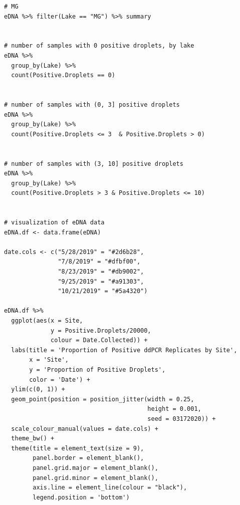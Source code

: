 \documentclass[12pt]{article}\usepackage[]{graphicx}\usepackage[]{color}
\makeatletter
\newenvironment{kframe}{%
 \def\at@end@of@kframe{}%
 \ifinner\ifhmode%
  \def\at@end@of@kframe{\end{minipage}}%
  \begin{minipage}{\columnwidth}%
 \fi\fi%
 \def\FrameCommand##1{\hskip\@totalleftmargin \hskip-\fboxsep
 \colorbox{shadecolor}{##1}\hskip-\fboxsep
     \hskip-\linewidth \hskip-\@totalleftmargin \hskip\columnwidth}%
 \MakeFramed {\advance\hsize-\width
   \@totalleftmargin\z@ \linewidth\hsize
   \@setminipage}}%
 {\par\unskip\endMakeFramed%
 \at@end@of@kframe}
\newenvironment{knitrout}{}{} %
\newenvironment{kframe}{%
 \def\at@end@of@kframe{}%
 \ifinner\ifhmode%
  \def\at@end@of@kframe{\end{minipage}}%
  \begin{minipage}{\columnwidth}%
 \fi\fi%
 \def\FrameCommand##1{\hskip\@totalleftmargin \hskip-\fboxsep
 \colorbox{shadecolor}{##1}\hskip-\fboxsep
     \hskip-\linewidth \hskip-\@totalleftmargin \hskip\columnwidth}%
 \MakeFramed {\advance\hsize-\width
   \@totalleftmargin\z@ \linewidth\hsize
   \@setminipage}}%
 {\par\unskip\endMakeFramed%
 \at@end@of@kframe}
\newenvironment{knitrout}{}{} %
\makeatother
\begin{document}
\begin{knitrout}
\begin{kframe}
\begin{verbatim}
# MG
eDNA %>% filter(Lake == "MG") %>% summary


# number of samples with 0 positive droplets, by lake
eDNA %>% 
  group_by(Lake) %>%
  count(Positive.Droplets == 0)


# number of samples with (0, 3] positive droplets
eDNA %>% 
  group_by(Lake) %>%
  count(Positive.Droplets <= 3  & Positive.Droplets > 0)


# number of samples with (3, 10] positive droplets
eDNA %>% 
  group_by(Lake) %>%
  count(Positive.Droplets > 3 & Positive.Droplets <= 10)


# visualization of eDNA data
eDNA.df <- data.frame(eDNA)

date.cols <- c("5/28/2019" = "#2d6b28", 
               "7/8/2019" = "#dfbf00",
               "8/23/2019" = "#db9002",
               "9/25/2019" = "#a91303",
               "10/21/2019" = "#5a4320")

eDNA.df %>% 
  ggplot(aes(x = Site, 
             y = Positive.Droplets/20000, 
             colour = Date.Collected)) + 
  labs(title = 'Proportion of Positive ddPCR Replicates by Site', 
       x = 'Site', 
       y = 'Proportion of Positive Droplets', 
       color = 'Date') +
  ylim(c(0, 1)) + 
  geom_point(position = position_jitter(width = 0.25, 
                                        height = 0.001, 
                                        seed = 03172020)) + 
  scale_colour_manual(values = date.cols) + 
  theme_bw() + 
  theme(title = element_text(size = 9),
        panel.border = element_blank(), 
        panel.grid.major = element_blank(),
        panel.grid.minor = element_blank(), 
        axis.line = element_line(colour = "black"), 
        legend.position = 'bottom')
\end{verbatim}
\end{kframe}
\end{knitrout}


\end{document}
